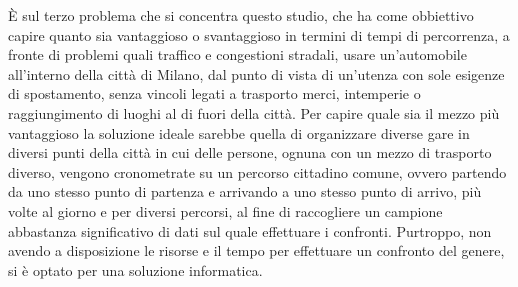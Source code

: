 È sul terzo problema che si concentra questo studio, che ha come obbiettivo capire quanto sia vantaggioso o svantaggioso in termini di tempi di percorrenza, a fronte di problemi quali traffico e congestioni stradali, usare un'automobile all'interno della città di Milano, dal punto di vista di un'utenza con sole esigenze di spostamento, senza vincoli legati a trasporto merci, intemperie o raggiungimento di luoghi al di fuori della città. Per capire quale sia il mezzo più vantaggioso la soluzione ideale sarebbe quella di organizzare diverse gare in diversi punti della città in cui delle persone, ognuna con un mezzo di trasporto diverso, vengono cronometrate su un percorso cittadino comune, ovvero partendo da uno stesso punto di partenza e arrivando a uno stesso punto di arrivo, più volte al giorno e per diversi percorsi, al fine di raccogliere un campione abbastanza significativo di dati sul quale effettuare i confronti. Purtroppo, non avendo a disposizione le risorse e il tempo per effettuare un confronto del genere, si è optato per una soluzione informatica.